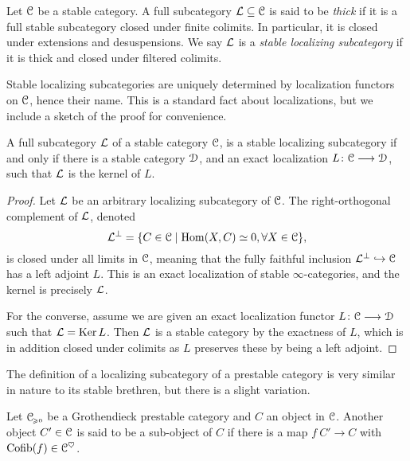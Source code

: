 \begin{definition}
    Let $\EuScript{C}$ be a stable category. A full subcategory $\mathcal{L}\subseteq \EuScript{C}$ is said to be \emph{thick} if it is a full stable subcategory closed under finite colimits. In particular, it is closed under extensions and desuspensions. We say $\mathcal{L}$ is a \emph{stable localizing subcategory} if it is thick and closed under filtered colimits. 
\end{definition}

Stable localizing subcategories are uniquely determined by localization functors on $\EuScript{C}$, hence their name. This is a standard fact about localizations, but we include a sketch of the proof for convenience. 

\begin{lemma}
    A full subcategory $\mathcal{L}$ of a stable category $\EuScript{C}$, is a stable localizing subcategory if and only if there is a stable category $\EuScript{D}$, and an exact localization $L\colon\EuScript{C}\longrightarrow\EuScript{D}$, such that $\mathcal{L}$ is the kernel of $L$. 
\end{lemma}
\begin{proof}
    Let $\mathcal{L}$ be an arbitrary localizing subcategory of $\EuScript{C}$. The right-orthogonal complement of $\mathcal{L}$, denoted
    \[\mathcal{L}^\perp = \{C\in \EuScript{C} \mid \operatorname{Hom}(X, C)\simeq 0, \forall X\in \EuScript{C}\},\]
    is closed under all limits in $\EuScript{C}$, meaning that the fully faithful inclusion $\mathcal{L}^\perp \hookrightarrow \EuScript{C}$ has a left adjoint $L$. This is an exact localization of stable $\infty$-categories, and the kernel is precisely $\mathcal{L}$. 
    
    For the converse, assume we are given an exact localization functor $L\colon \EuScript{C}\longrightarrow \EuScript{D}$ such that $\mathcal{L} = \operatorname{Ker} L$. Then $\mathcal{L}$ is a stable category by the exactness of $L$, which is in addition closed under colimits as $L$ preserves these by being a left adjoint. 
\end{proof}


The definition of a localizing subcategory of a prestable category is very similar in nature to its stable brethren, but there is a slight variation. 

\begin{definition}
    Let $\EuScript{C}_{\hspace{-1pt}\scriptscriptstyle\geqslant 0}$ be a Grothendieck prestable category and $C$ an object in $\EuScript{C}$. Another object $C'\in \EuScript{C}$ is said to be a sub-object of $C$ if there is a map $f\: C'\to C$ with $ \operatorname{Cofib}(f)\in \EuScript{C}^\heartsuit$. 
\end{definition}

